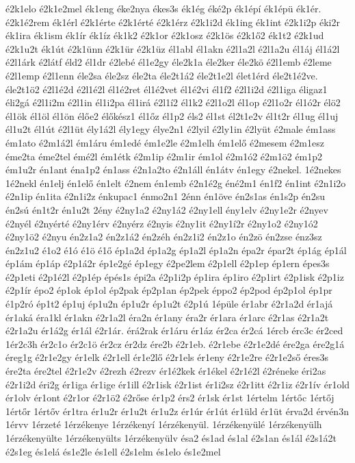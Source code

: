 {é2k1elo
é2k1e2mel
ék1eng
éke2nya
ékes3s
ék1ég
éké2p
ék1épí
ék1épü
ék1ér.
é2k1é2rem
ék1érl
é2k1érte
é2k1érté
é2k1érz
é2k1i2d
ék1ing
ék1int
é2k1i2p
éki2r
ék1ira
ék1ism
ék1ír
ék1íz
ék1k2
é2k1or
é2k1osz
é2k1ös
é2k1ő2
ék1t2
é2k1ud
é2k1u2t
ék1út
é2k1ünn
é2k1ür
é2k1üz
él1abl
él1akn
é2l1a2l
é2l1a2u
él1áj
él1á2l
é2l1árk
é2látf
éld2
él1dr
é2lebé
él1e2gy
éle2k1a
éle2ker
éle2kö
é2l1emb
é2leme
é2l1emp
é2l1enn
éle2sa
éle2sz
éle2ta
éle2t1á2
éle2t1e2l
élet1érd
éle2t1é2ve.
éle2t1ö2
é2l1é2d
é2l1é2l
él1é2ret
él1é2vet
él1é2vi
él1f2
é2l1i2d
é2l1iga
éligaz1
éli2gá
é2l1i2m
é2l1in
él1i2pa
él1irá
é2l1í2
él1k2
é2l1o2l
él1op
é2l1o2r
él1ó2r
élö2
él1ök
él1öl
él1ön
élőe2
élőkész1
él1őz
él1p2
éls2
él1st
él2t1e2v
él1t2r
él1ug
él1uj
él1u2t
él1út
é2l1üt
ély1á2l
ély1egy
élye2n1
é2lyil
é2ly1in
é2lyüt
é2male
ém1ass
ém1ato
é2m1á2l
ém1áru
ém1edé
ém1e2le
é2m1elh
ém1elő
é2mesem
é2m1esz
éme2ta
éme2tel
émé2l
ém1étk
é2m1ip
é2m1ir
ém1ol
é2m1ó2
é2m1ö2
ém1p2
ém1u2r
én1ant
éna1p2
én1ass
é2n1a2to
é2n1áll
én1átv
én1egy
é2nekel.
1é2nekes
1é2nekl
én1elj
én1elő
én1elt
é2nem
én1emb
é2n1é2g
éné2m1
én1f2
én1int
é2n1i2o
é2n1ip
én1ita
é2n1i2z
énkupac1
énmo2n1
2énn
én1öve
én2s1as
én1s2p
én2su
én2sú
én1t2r
én1u2t
2ény
é2ny1a2
é2ny1á2
é2ny1ell
ény1elv
é2ny1e2r
é2nyev
é2nyél
é2nyérté
é2ny1érv
é2nyérz
é2nyis
é2ny1it
é2ny1í2r
é2ny1o2
é2ny1ó2
é2ny1ö2
é2nyu
én2z1a2
én2z1á2
én2zéh
én2z1i2
én2z1o
én2zö
én2zse
énz3sz
én2z1u2
é1o2
é1ó
é1ö
é1ő
ép1a2d
ép1a2g
ép1a2l
ép1a2n
épa2r
épar2t
ép1ág
ép1ál
ép1ám
ép1áp
é2p1á2r
ép1e2gé
ép1egy
é2pe2lem
é2p1ell
é2p1ep
ép1ern
épes3s
é2p1eti
é2p1é2l
é2p1ép
épés1s
épi2a
é2p1i2p
ép1ira
ép1iro
é2p1irt
é2p1isk
é2p1iz
é2p1ír
épo2
ép1ok
ép1ol
ép2pak
ép2p1an
ép2pek
éppo2
ép2pod
ép2p1ol
ép1pr
é1p2ró
ép1t2
ép1uj
ép1u2n
ép1u2r
ép1u2t
é2p1ú
1épüle
ér1abr
é2r1a2d
ér1ajá
ér1aká
éra1kl
ér1akn
é2r1a2l
éra2n
ér1any
éra2r
ér1ara
ér1arc
é2r1as
é2r1a2t
é2r1a2u
ér1á2g
ér1ál
é2r1ár.
érá2rak
ér1áru
ér1áz
ér2ca
ér2cá
1ércb
érc3c
ér2ced
1ér2c3h
ér2c1o
ér2c1ö
ér2cz
ér2dz
ére2b
é2r1eb.
é2r1ebe
é2r1e2dé
ére2ga
ére2g1á
éreg1g
é2r1e2gy
ér1elk
é2r1ell
ér1e2lő
é2r1els
ér1eny
é2r1e2re
é2r1e2ső
éres3s
ére2ta
ére2tel
é2r1e2v
é2rezh
é2rezv
ér1é2kek
ér1ékel
é2r1é2l
é2réneke
éri2as
é2r1i2d
éri2g
ér1iga
ér1ige
ér1ill
é2r1isk
é2r1ist
ér1i2sz
é2r1itt
é2r1iz
é2r1ív
ér1old
ér1olv
ér1ont
é2r1or
é2r1ö2
é2rőse
ér1p2
érs2
ér1sk
ér1st
1értelm
1értőc
1értőj
1értőr
1értőv
ér1tra
ér1u2r
ér1u2t
ér1u2z
ér1úr
ér1út
ér1üld
ér1üt
érva2d
érvén3n
1érvv
1érzeté
1érzékenye
1érzékenyí
1érzékenyül.
1érzékenyülé
1érzékenyülh
1érzékenyülte
1érzékenyülts
1érzékenyülv
ésa2
és1ad
és1al
é2s1an
és1ál
é2s1á2t
é2s1eg
és1elá
és1e2le
és1ell
é2s1elm
és1elo
és1e2mel
}
